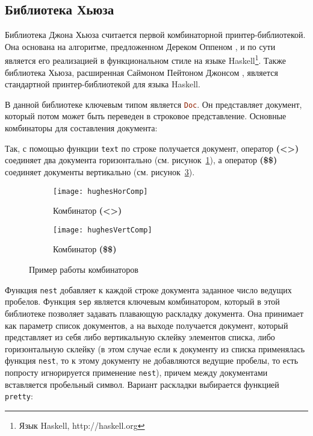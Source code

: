 \subsection{Библиотека Хьюза}

Библиотека Джона Хьюза\cite{hughes} считается первой комбинаторной принтер-библиотекой. Она основана на алгоритме, предложенном Дереком Оппеном \cite{oppen}, и по сути является его реализацией в функциональном стиле на языке Haskell\footnote{Язык Haskell, http://haskell.org}. Также библиотека Хьюза, расширенная Саймоном Пейтоном Джонсом \cite{peytonJones}, является стандартной принтер-библиотекой для языка Haskell.


В данной библиотеке ключевым типом является \lstinline[language=Haskell]{Doc}. Он представляет документ, который потом может быть переведен в строковое представление.
Основные комбинаторы для составления документа:


Так, с помощью функции \lstinline[language=Haskell]{text} по строке получается документ, оператор \textbf{(<>)} соединяет два документа горизонтально (см. рисунок~\ref{fig:hughesHorComp}), а оператор \textbf{(\$\$)} соединяет документы вертикально (см. рисунок~\ref{fig:hughesVertComp}).

\begin{figure}[ht]
	\begin{subfigure}[b]{0.45\linewidth}
		\centering
		\texttt{[image: hughesHorComp]}
		\caption{Комбинатор \textbf{(<>)}}
		\label{fig:hughesHorComp}
	\end{subfigure}
	\hspace{0.5cm}
	\begin{subfigure}[b]{0.45\linewidth}
		\centering
		\texttt{[image: hughesVertComp]}
		\caption{Комбинатор \textbf{(\$\$)}}
		\label{fig:hughesVertComp}
	\end{subfigure}

	\caption{Пример работы комбинаторов}
\end{figure}

Функция \lstinline[language=Haskell]{nest} добавляет к каждой строке документа заданное число ведущих пробелов. Функция \lstinline[language=Haskell]{sep} является ключевым комбинатором, который в этой библиотеке позволяет задавать плавающую раскладку документа. Она принимает как параметр список документов, а на выходе получается документ, который представляет из себя либо вертикальную склейку элементов списка, либо горизонтальную склейку (в этом случае если к документу из списка применялась функция \lstinline[language=Haskell]{nest}, то к этому документу не добавляются ведущие пробелы, то есть попросту игнорируется применение \lstinline[language=Haskell]{nest}), причем между документами вставляется пробельный символ. Вариант раскладки выбирается функцией \lstinline[language=Haskell]{pretty}:

